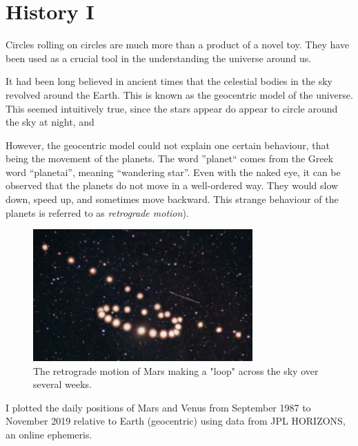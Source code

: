 
\section{History I}

Circles rolling on circles are much more than a product of a novel toy. They have been used as a crucial tool in the understanding the universe around us.

It had been long believed in ancient times that the celestial bodies in the sky revolved around the Earth. This is known as the geocentric model of the universe. This seemed intuitively true, since the stars appear do appear to circle around the sky at night, and 

However, the geocentric model could not explain one certain behaviour, that being the movement of the planets. The word ''planet`` comes from the Greek word ``planetai'', meaning ``wandering star''. Even with the naked eye, it can be observed that the planets do not move in a well-ordered way. They would slow down, speed up, and sometimes move backward. This strange behaviour of the planets is referred to as \textit{retrograde motion}).
 \begin{figure}[H]
     \centering
     \includegraphics[width=0.75\textwidth]{figures/marsRetro.jpg}
     \caption{The retrograde motion of Mars making a "loop" across the sky over several weeks.}
     \label{fig:my_label}
 \end{figure}

I plotted the daily positions of Mars and Venus from September 1987 to November 2019 relative to Earth (geocentric) using data from JPL HORIZONS, an online ephemeris.  

